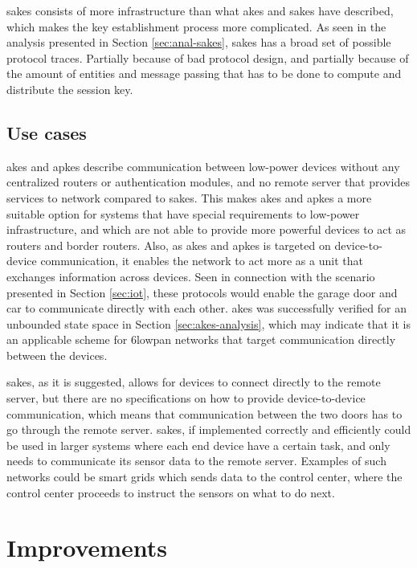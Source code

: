 \gls{sakes} consists of more infrastructure than what \gls{akes} and \gls{sakes} have described, which makes the key establishment process more complicated. As seen in the analysis presented in Section \ref{sec:anal-sakes}, \gls{sakes} has a broad set of possible protocol traces. Partially because of bad protocol design, and partially because of the amount of entities and message passing that has to be done to compute and distribute the session key.


\subsection{Use cases}


\gls{akes} and \gls{apkes} describe communication between low-power devices without any centralized routers or authentication modules, and no remote server that provides services to network compared to \gls{sakes}. This makes \gls{akes} and \gls{apkes} a more suitable option for systems that have special requirements to low-power infrastructure, and which are not able to provide more powerful devices to act as routers and border routers. Also, as \gls{akes} and \gls{apkes} is targeted on device-to-device communication, it enables the network to act more as a unit that exchanges information across devices. Seen in connection with the scenario presented in Section \ref{sec:iot}, these protocols would enable the garage door and car to communicate directly with each other. \gls{akes} was successfully verified for an unbounded state space in Section \ref{sec:akes-analysis}, which may indicate that it is an applicable scheme for \gls{6lowpan} networks that target communication directly between the devices.

\gls{sakes}, as it is suggested, allows for devices to connect directly to the remote server, but there are no specifications on how to provide device-to-device communication, which means that communication between the two doors has to go through the remote server. \gls{sakes}, if implemented correctly and efficiently could be used in larger systems where each end device have a certain task, and only needs to communicate its sensor data to the remote server. Examples of such networks could be smart grids which sends data to the control center, where the control center proceeds to instruct the sensors on what to do next.



\section{Improvements}

